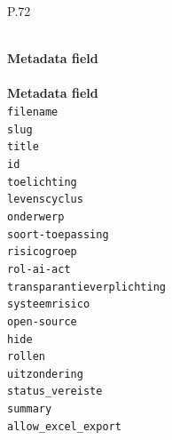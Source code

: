 \begingroup
\small
\renewcommand{\arraystretch}{1.10}
\setlength{\LTcapwidth}{\textwidth}
\setlength{\LTleft}{0pt plus 1fill}
\setlength{\LTright}{0pt plus 1fill}
\begin{longtable}{P{.72\textwidth}}
\caption{Metadata fields present in Algoritmekader requirement files.}
\label{tab:v1-algoritmekader-metadata-fields} \\
\toprule
\textbf{Metadata field} \\
\midrule
\endfirsthead
{} \\
\toprule
\textbf{Metadata field} \\
\midrule
\endhead
\bottomrule
\endlastfoot
\texttt{filename} \\
\texttt{slug} \\
\texttt{title} \\
\texttt{id} \\
\texttt{toelichting} \\
\texttt{levenscyclus} \\
\texttt{onderwerp} \\
\texttt{soort-\allowbreak{}toepassing} \\
\texttt{risicogroep} \\
\texttt{rol-\allowbreak{}ai-\allowbreak{}act} \\
\texttt{transparantieverplichting} \\
\texttt{systeemrisico} \\
\texttt{open-\allowbreak{}source} \\
\texttt{hide} \\
\texttt{rollen} \\
\texttt{uitzondering} \\
\texttt{status\_\allowbreak{}vereiste} \\
\texttt{summary} \\
\texttt{allow\_\allowbreak{}excel\_\allowbreak{}export} \\
\end{longtable}
\endgroup